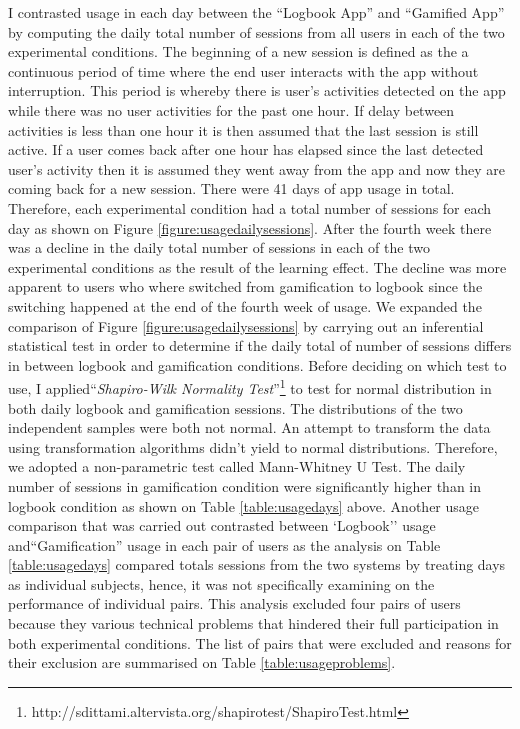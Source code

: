 \documentclass{sig-alternate}
\begin{document}
I contrasted usage in each day between the ``Logbook App'' and ``Gamified App'' by computing the daily total number of sessions from all users in each of the two experimental conditions. The beginning of a new session is defined as the a continuous period of time where the end user interacts with the app without interruption. This period is whereby there is user's activities detected on the app while there was no user activities for the past one hour. If delay between activities is less than one hour it is then assumed that the last session is still active. If a user comes back after one hour has elapsed since the last detected user's activity then it is assumed they went away from the app and now they are coming back for a new session. There were 41 days of app usage in total. Therefore, each experimental condition had a total number of sessions for each day as shown on Figure \ref{figure:usagedailysessions}. After the fourth week there was a decline in the daily total number of sessions in each of the two experimental conditions as the result of the learning effect. The decline was more apparent to users who where switched from gamification to logbook since the switching happened at the end of the fourth week of usage.\newline
We expanded the comparison of Figure \ref {figure:usagedailysessions} by carrying out an inferential statistical test in order to determine if the daily total of number of sessions differs in between logbook and gamification conditions. Before deciding on which test to use, I applied``\emph{Shapiro-Wilk Normality Test}''\footnote{http://sdittami.altervista.org/shapirotest/ShapiroTest.html} to test for normal distribution in both daily logbook and gamification sessions. The distributions of the two independent samples were both not normal. An attempt to transform the data using transformation algorithms didn't yield to normal distributions. Therefore, we adopted a non-parametric test called Mann-Whitney U Test. The  daily number of sessions in gamification condition were significantly higher than in logbook condition as shown on Table \ref{table:usagedays} above.\newline
Another usage comparison that was carried out contrasted between `Logbook'' usage and``Gamification'' usage in each pair of users as the analysis on Table \ref{table:usagedays} compared totals sessions from the two systems by treating days as individual subjects, hence, it  was not specifically examining on the performance of individual pairs. This analysis excluded four pairs of users because they various technical problems that hindered their full participation in both experimental conditions. The list of pairs that were excluded and reasons for their exclusion are summarised on Table \ref{table:usageproblems}. \newline
\end{document}
